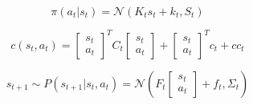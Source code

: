 \begin{equation}
\label{formula:linear_gaussian_controller}
    \pi(a_{t}|s_{t}) = \mathcal{N}(K_{t}s_{t} + k_{t}, S_{t})
\end{equation}

\begin{equation}
\label{formula:quadratic_cost_function}
c(s_{t},a_{t}) = \begin{bmatrix}
s_{t}
\\ 
a_{t}
\end{bmatrix}^{T}C_{t}\begin{bmatrix}
s_{t}
\\ 
a_{t}
\end{bmatrix} + \begin{bmatrix}
s_{t}
\\ 
a_{t}
\end{bmatrix}^{T} c_{t} + cc_{t}
\end{equation}

\begin{equation}
\label{formula:gaussian_dyn}
s_{t+1} \sim P(s_{t+1}|s_{t},a_{t}) = \mathcal{N}(F_{t}
\begin{bmatrix}
s_{t}
\\ 
a_{t}
\end{bmatrix} + f_{t}, \Sigma_{t})
\end{equation}


